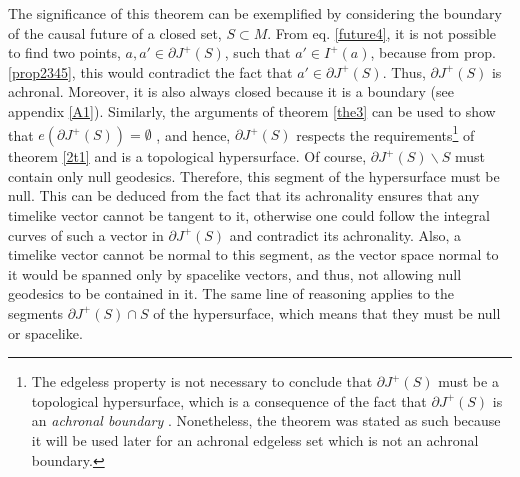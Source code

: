 \documentclass[
12pt,		%
openright,	%
twoside,  %
a4paper,			%
chapter=TITLE,		%
english,			%
french,				%
spanish,			%
brazil				%
]{USPSC-classe/USPSC}
\begin{document}
The significance of this theorem can be exemplified by considering the boundary of the causal future of a closed set, $S\subset M$. From eq. \ref{future4}, it is not possible to find two points, $a,a'\in\partial J^+(S)$, such that $a'\in I^+(a)$, because from prop. \ref{prop2345}, this would contradict the fact that $a'\in\partial J^+(S)$. Thus, $\partial J^+(S)$ is achronal. Moreover, it is also always closed because it is a boundary (see appendix \ref{A1}). Similarly, the arguments of theorem \ref{the3} can be used to show that $e(\partial J^+(S))=\emptyset$ \cite{Penrose1972}, and hence, $\partial J^+(S)$ respects the requirements\footnote{The edgeless property is not necessary to conclude that $\partial J^+(S)$ must be a topological hypersurface, which is a consequence of the fact that $\partial J^+(S)$ is an \textit{achronal boundary} \cite{Penrose1972}. Nonetheless, the theorem was stated as such because it will be used later for an achronal edgeless set which is not an achronal boundary.} of theorem \ref{2t1} and is a topological hypersurface. Of course, $\partial J^+(S)\backslash S$ must contain only null geodesics. Therefore, this segment of the hypersurface must be null. This can be deduced from the fact that its achronality ensures that any timelike vector cannot be tangent to it, otherwise one could follow the integral curves of such a vector in $\partial J^+(S)$ and contradict its achronality. Also, a timelike vector cannot be normal to this segment, as the vector space normal to it would be spanned only by spacelike vectors, and thus, not allowing null geodesics to be contained in it. The same line of reasoning applies to the segments $\partial J^+(S)\cap {S}$ of the hypersurface, which means that they must be null or spacelike.
\end{document}
